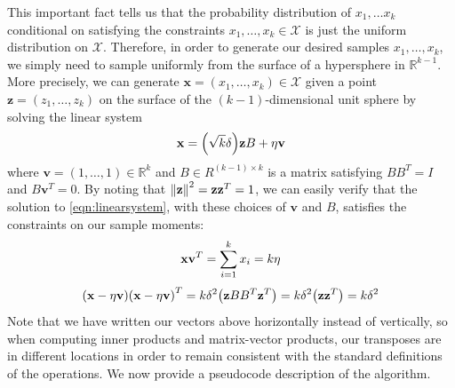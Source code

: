 \documentclass[12pt, a4paper]{article}
\newcommand{\R}{\mathbb{R}}
\DeclarePairedDelimiter \norm{\lVert}{\rVert}
\DeclarePairedDelimiter \parens{(}{)}
\begin{document}
        This important fact tells us that the probability distribution of $x_1, \dots x_k$
        conditional on satisfying the constraints $x_1, \dots, x_k \in \mathcal{X}$ is just the uniform distribution on $\mathcal{X}$.
        Therefore, in order to generate our desired samples $x_1, \dots, x_k$, we simply need to sample uniformly from the surface of a hypersphere in $\R^{k - 1}$.
        More precisely, we can generate $\mathbf{x} = (x_1, \dots, x_k) \in \mathcal{X}$ given a point $\mathbf{z} = (z_1, \dots, z_k)$
        on the surface of the $(k - 1)$-dimensional unit sphere by solving the linear system
        \begin{equation}
            \label{eqn:linearsystem}
            \mathbf{x} = \parens*{\sqrt{k}\delta}\mathbf{z}B + \eta\mathbf{v}
        \end{equation}
        where $\mathbf{v} = (1, \dots, 1) \in \R^k$ and $B \in R^{(k - 1) \times k}$ is a matrix satisfying $BB^T = I$ and $B\mathbf{v}^T = 0$.
        By noting that $\norm*{\mathbf{z}}^2 = \mathbf{z}\mathbf{z}^T = 1$,
        we can easily verify that the solution to \autoref{eqn:linearsystem}, with these choices of $\mathbf{v}$ and $B$, satisfies the constraints on our sample moments:
        \begin{equation*}
            \mathbf{x}\mathbf{v}^T = \sum_{i = 1}^{k}x_i = k\eta\\
        \end{equation*}
        \begin{equation*}
            \parens*{\mathbf{x} - \eta\mathbf{v}}\parens*{\mathbf{x} - \eta\mathbf{v}}^T = k\delta^2\parens*{\mathbf{z}BB^T\mathbf{z}^T}
            = k\delta^2\parens*{\mathbf{z}\mathbf{z}^T} = k\delta^2
        \end{equation*}
        Note that we have written our vectors above horizontally instead of vertically, so when computing inner products and matrix-vector products,
        our transposes are in different locations in order to remain consistent with the standard definitions of the operations.
        We now provide a pseudocode description of the algorithm.
\end{document}
